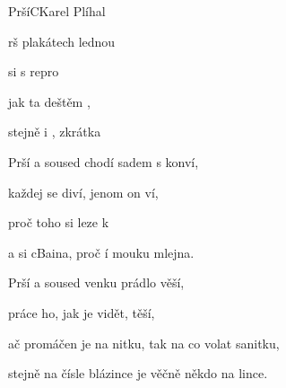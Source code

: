 \setcounter{page}{71}
\begin{song}{Prší}{C}{Karel Plíhal}

\begin{SBChorus}

rš   plakátech lednou

 si  s repro

jak ta  deštěm ,

stejně  i , zkrátka

\end{SBChorus}

\begin{SBVerse}

Prší a soused chodí sadem s konví,

každej se diví, jenom on ví,

proč  toho  si leze k 

a  si cBaina, proč í mouku  mlejna.

\end{SBVerse}

\begin{SBChorus}

\end{SBChorus}

\begin{SBVerse}

Prší a soused venku prádlo věší,

práce ho, jak je vidět, těší,

ač promáčen je na nitku, tak na co volat sanitku,

stejně na čísle blázince je věčně někdo na lince.

\end{SBVerse}

\end{song}

\clearpage
